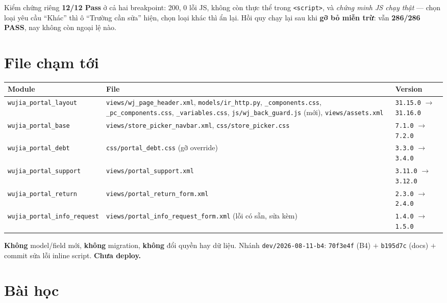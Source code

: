 Kiểm chứng riêng \textbf{12/12 Pass} ở cả hai breakpoint: 200, 0 lỗi JS, không còn thực thể
trong \texttt{<script>}, và \emph{chứng minh JS chạy thật} --- chọn loại yêu cầu ``Khác'' thì
ô ``Trường cần sửa'' hiện, chọn loại khác thì ẩn lại. Hồi quy chạy lại sau khi
\textbf{gỡ bỏ miễn trừ}: vẫn \textbf{286/286 PASS}, nay không còn ngoại lệ nào.

\section{File chạm tới}

\begin{center}
\begin{tabular}{@{}p{4.4cm}p{6.6cm}p{3.1cm}@{}}
\hline
\textbf{Module} & \textbf{File} & \textbf{Version} \\
\hline
\texttt{wujia\_portal\_layout} & \texttt{views/wj\_page\_header.xml},
  \texttt{models/ir\_http.py}, \texttt{\_components.css},
  \texttt{\_pc\_components.css}, \texttt{\_variables.css},
  \texttt{js/wj\_back\_guard.js} (mới), \texttt{views/assets.xml} &
  \texttt{31.15.0} $\to$ \texttt{31.16.0} \\
\texttt{wujia\_portal\_base} & \texttt{views/store\_picker\_navbar.xml},
  \texttt{css/store\_picker.css} & \texttt{7.1.0} $\to$ \texttt{7.2.0} \\
\texttt{wujia\_portal\_debt} & \texttt{css/portal\_debt.css} (gỡ override) &
  \texttt{3.3.0} $\to$ \texttt{3.4.0} \\
\texttt{wujia\_portal\_support} & \texttt{views/portal\_support.xml} &
  \texttt{3.11.0} $\to$ \texttt{3.12.0} \\
\texttt{wujia\_portal\_return} & \texttt{views/portal\_return\_form.xml} &
  \texttt{2.3.0} $\to$ \texttt{2.4.0} \\
\texttt{wujia\_portal\_info\_request} & \texttt{views/portal\_info\_request\_form.xml}
  (lỗi có sẵn, sửa kèm) & \texttt{1.4.0} $\to$ \texttt{1.5.0} \\
\hline
\end{tabular}
\end{center}

\textbf{Không} model/field mới, \textbf{không} migration, \textbf{không} đổi quyền hay dữ liệu.
Nhánh \texttt{dev/2026-08-11-b4}: \texttt{70f3e4f} (B4) $+$ \texttt{b195d7c} (docs) $+$
commit sửa lỗi inline script. \textbf{Chưa deploy.}

\section{Bài học}

